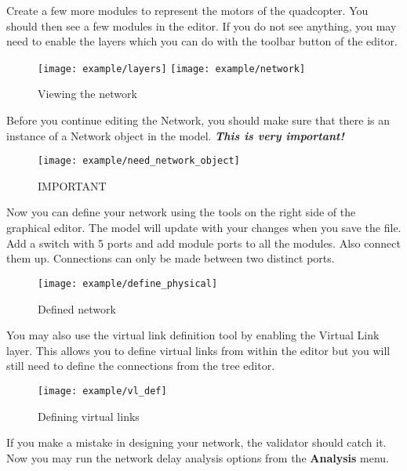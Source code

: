 Create a few more modules to represent the motors of the quadcopter. You should then see
a few modules in the editor. If you do not see anything, you may need to enable the layers
which you can do with the toolbar button of the editor.
\begin{figure}[H]
\centering
    \texttt{[image: example/layers]}
    \texttt{[image: example/network]}
\caption{Viewing the network}
\end{figure}

Before you continue editing the Network, you should make sure that there
is an instance of a Network object in the model. \textit{\textbf{This is very important!}}
\begin{figure}[H]
\centering
    \texttt{[image: example/need\_network\_object]}
\caption{IMPORTANT}
\end{figure}

Now you can define your network using the tools on the right side of the graphical editor.
The model will update with your changes when you save the file. Add a switch with 5 ports 
and add module ports to all the modules. Also connect them up. Connections can only
be made between two distinct ports.
\begin{figure}[H]
\centering
    \texttt{[image: example/define\_physical]}
\caption{Defined network}
\end{figure}

You may also use the virtual link definition tool by enabling the Virtual Link layer. This allows
you to define virtual links from within the editor but you will still need to define the connections
from the tree editor.
\begin{figure}[H]
\centering
    \texttt{[image: example/vl\_def]}
\caption{Defining virtual links}
\end{figure}

If you make a mistake in designing your network, the validator should catch it. Now you may
run the network delay analysis options from the \textbf{Analysis} menu.
